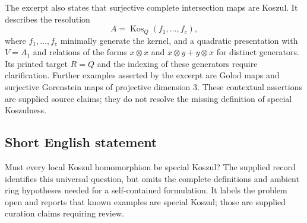 \documentclass[11pt]{article}
\begin{document}
The excerpt also states that surjective complete intersection maps are Koszul. It describes the resolution
\[
A=\operatorname{Kos}_Q(f_1,\ldots,f_c),
\]
where \(f_1,\ldots,f_c\) minimally generate the kernel, and a quadratic presentation with \(V=A_1\) and relations of the forms \(x\otimes x\) and \(x\otimes y+y\otimes x\) for distinct generators. Its printed target \(R=Q\) and the indexing of these generators require clarification. Further examples asserted by the excerpt are Golod maps and surjective Gorenstein maps of projective dimension \(3\). These contextual assertions are supplied source claims; they do not resolve the missing definition of special Koszulness.
\subsection{Short English statement}
Must every local Koszul homomorphism be special Koszul? The supplied record identifies this universal question, but omits the complete definitions and ambient ring hypotheses needed for a self-contained formulation. It labels the problem open and reports that known examples are special Koszul; those are supplied curation claims requiring review.
\end{document}
